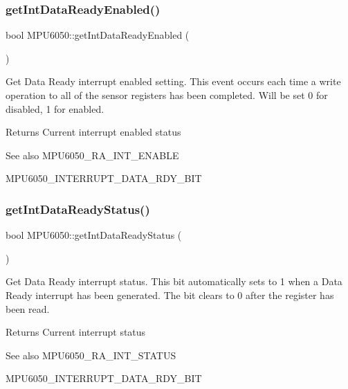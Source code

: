 \subsubsection{\texorpdfstring{getIntDataReadyEnabled()}{getIntDataReadyEnabled()}}
{\footnotesize\ttfamily bool M\+P\+U6050\+::get\+Int\+Data\+Ready\+Enabled (\begin{DoxyParamCaption}{ }\end{DoxyParamCaption})}

Get Data Ready interrupt enabled setting. This event occurs each time a write operation to all of the sensor registers has been completed. Will be set 0 for disabled, 1 for enabled. \begin{DoxyReturn}{Returns}
Current interrupt enabled status 
\end{DoxyReturn}
\begin{DoxySeeAlso}{See also}
M\+P\+U6050\+\_\+\+R\+A\+\_\+\+I\+N\+T\+\_\+\+E\+N\+A\+B\+LE 

M\+P\+U6050\+\_\+\+I\+N\+T\+E\+R\+R\+U\+P\+T\+\_\+\+D\+A\+T\+A\+\_\+\+R\+D\+Y\+\_\+\+B\+IT 
\end{DoxySeeAlso}
\mbox{\label{class_m_p_u6050_ae4f434eb51a15b536e2e8f89a776872b}} 
\subsubsection{\texorpdfstring{getIntDataReadyStatus()}{getIntDataReadyStatus()}}
{\footnotesize\ttfamily bool M\+P\+U6050\+::get\+Int\+Data\+Ready\+Status (\begin{DoxyParamCaption}{ }\end{DoxyParamCaption})}

Get Data Ready interrupt status. This bit automatically sets to 1 when a Data Ready interrupt has been generated. The bit clears to 0 after the register has been read. \begin{DoxyReturn}{Returns}
Current interrupt status 
\end{DoxyReturn}
\begin{DoxySeeAlso}{See also}
M\+P\+U6050\+\_\+\+R\+A\+\_\+\+I\+N\+T\+\_\+\+S\+T\+A\+T\+US 

M\+P\+U6050\+\_\+\+I\+N\+T\+E\+R\+R\+U\+P\+T\+\_\+\+D\+A\+T\+A\+\_\+\+R\+D\+Y\+\_\+\+B\+IT 
\end{DoxySeeAlso}
\mbox{\label{class_m_p_u6050_a295c9600579557df065aff88bc7a1d83}} 
